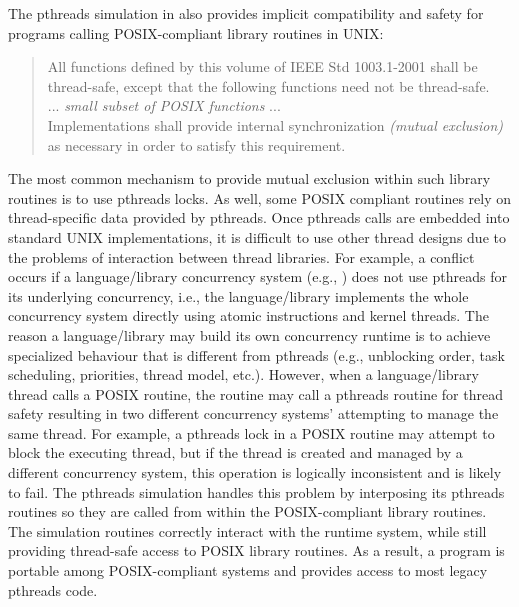 \documentclass[openright,twoside]{report}
\begin{document}
The pthreads simulation in \uC also provides implicit compatibility and safety for programs calling POSIX-compliant library routines in UNIX:
\begin{quote}
All functions defined by this volume of IEEE Std 1003.1-2001 shall be thread-safe, except that the following functions need not be thread-safe.\\
\hspace*{10pt} ... \emph{small subset of POSIX functions} ... \\
Implementations shall provide internal synchronization \emph{(mutual exclusion)} as necessary in order to satisfy this requirement.~\cite[pp.~507--508]{POSIX08}
\end{quote}
The most common mechanism to provide mutual exclusion within such library routines is to use pthreads locks.
As well, some POSIX compliant routines rely on thread-specific data provided by pthreads.
Once pthreads calls are embedded into standard UNIX implementations, it is difficult to use other thread designs due to the problems of interaction between thread libraries.
For example, a conflict occurs if a language/library concurrency system (e.g., \uC) does not use pthreads for its underlying concurrency, i.e., the language/library implements the whole concurrency system directly using atomic instructions and kernel threads.
The reason a language/library may build its own concurrency runtime is to achieve specialized behaviour that is different from pthreads (e.g., unblocking order, task scheduling, priorities, thread model, etc.).
However, when a language/library thread calls a POSIX routine, the routine may call a pthreads routine for thread safety resulting in two different concurrency systems' attempting to manage the same thread.
For example, a pthreads lock in a POSIX routine may attempt to block the executing thread, but if the thread is created and managed by a different concurrency system, this operation is logically inconsistent and is likely to fail.
The \uC pthreads simulation handles this problem by interposing its pthreads routines so they are called from within the POSIX-compliant library routines.
The simulation routines correctly interact with the \uC runtime system, while still providing thread-safe access to POSIX library routines.
As a result, a \uC program is portable among POSIX-compliant systems and provides access to most legacy pthreads code.
\end{document}
